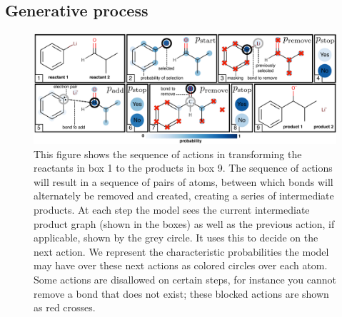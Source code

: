 \subsection{Generative process}

%



\begin{figure}
\centering
\includegraphics[width=\textwidth]{reaction_model_blue}
\caption{
 This figure shows the sequence of actions in transforming the reactants in box 1 to the products in box 9.
 The sequence of actions will result in a sequence of pairs of atoms, between which bonds will alternately be removed and created, creating a series of intermediate products. 
At each step the model sees the current intermediate product graph (shown in the boxes) as well as the previous action, if applicable, shown by the grey circle. It uses this to decide on the next action.
We represent the characteristic probabilities the model may have over these next actions as colored circles over each atom.
Some actions are disallowed on certain steps, for instance you cannot remove a bond that does not exist; these blocked actions are shown as red crosses.
}
\label{fig:reaction_model}
\end{figure}




